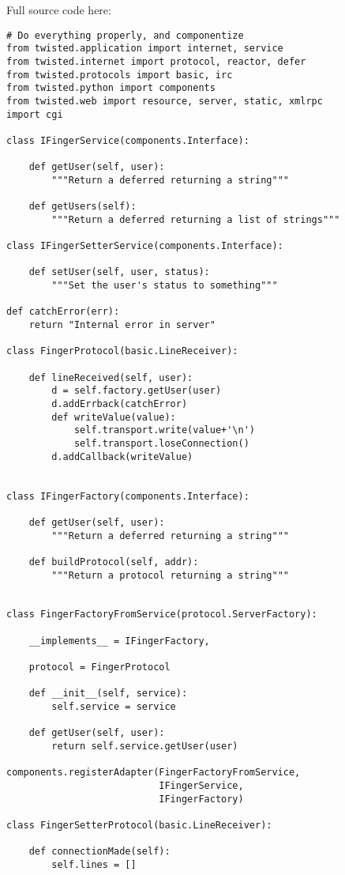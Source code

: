  Full source code here: \begin{verbatim}
# Do everything properly, and componentize
from twisted.application import internet, service
from twisted.internet import protocol, reactor, defer
from twisted.protocols import basic, irc
from twisted.python import components
from twisted.web import resource, server, static, xmlrpc
import cgi

class IFingerService(components.Interface):

    def getUser(self, user):
        """Return a deferred returning a string"""

    def getUsers(self):
        """Return a deferred returning a list of strings"""

class IFingerSetterService(components.Interface):

    def setUser(self, user, status):
        """Set the user's status to something"""

def catchError(err):
    return "Internal error in server"

class FingerProtocol(basic.LineReceiver):

    def lineReceived(self, user):
        d = self.factory.getUser(user)
        d.addErrback(catchError)
        def writeValue(value):
            self.transport.write(value+'\n')
            self.transport.loseConnection()
        d.addCallback(writeValue)


class IFingerFactory(components.Interface):

    def getUser(self, user):
        """Return a deferred returning a string"""

    def buildProtocol(self, addr):
        """Return a protocol returning a string"""


class FingerFactoryFromService(protocol.ServerFactory):

    __implements__ = IFingerFactory,

    protocol = FingerProtocol

    def __init__(self, service):
        self.service = service

    def getUser(self, user):
        return self.service.getUser(user)

components.registerAdapter(FingerFactoryFromService,
                           IFingerService,
                           IFingerFactory)

class FingerSetterProtocol(basic.LineReceiver):

    def connectionMade(self):
        self.lines = []


\end{verbatim}

